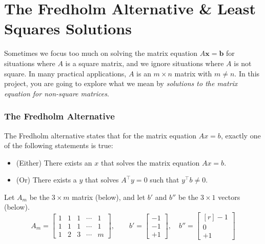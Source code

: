 
\section{The Fredholm Alternative \& Least Squares Solutions}
Sometimes we focus too much on solving the matrix equation $A \bm{x} = \bm{b}$ for situations where $A$ is a square matrix,  and we ignore situations where $A$ is not square. In many practical applications,  $A$ is an $m \times n$ matrix with $m \neq n$. 
In this project, you are going to explore what we mean by \textit{solutions to the matrix equation for non-square matrices}.

\subsubsection*{The Fredholm Alternative}
The Fredholm alternative states that for the matrix equation $Ax=b$, exactly one of the following statements is true:
\begin{itemize}
    \item (Either) There exists an $x$ that solves the matrix equation $Ax=b$.
    \item (Or) There exists a $y$ that solves $A^\top y = 0$ such that $y^\top b \neq 0$.
\end{itemize}
Let $A_m$ be the $3 \times m$ matrix (below), and let $b'$ and $b''$ be the $3 \times 1$ vectors (below).
\begin{equation*}
A_m = \begin{bmatrix} 1 & 1 & 1 & \cdots & 1\\ 1 & 1 & 1 & \cdots & 1 \\ 1 & 2 & 3 &  \cdots & m \end{bmatrix}, \quad  \quad b' = \begin{bmatrix} -1 \\ -1 \\ +1 \end{bmatrix}, \quad b'' = \begin{bmatrix*}[r] -1 \\ 0 \\ +1 \end{bmatrix*}
\end{equation*}

